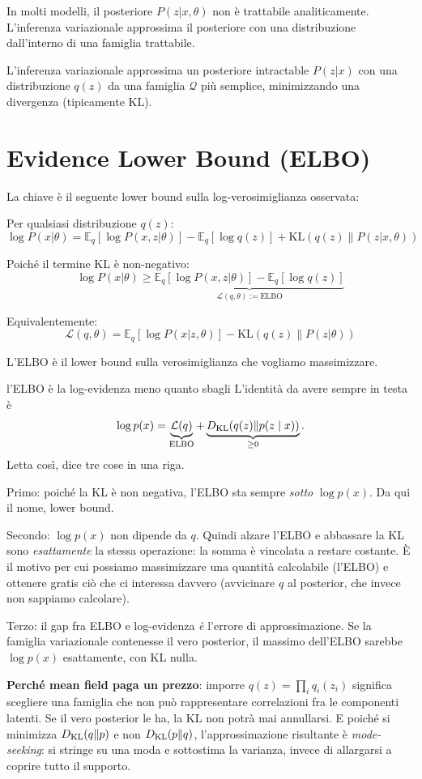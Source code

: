 In molti modelli, il posteriore $P(z|x,\theta)$ non è trattabile analiticamente. L'inferenza variazionale approssima il posteriore con una distribuzione dall'interno di una famiglia trattabile.

\begin{definition}
  L'inferenza variazionale approssima un posteriore intractable $P(z|x)$ con una distribuzione $q(z)$ da una famiglia $\mathcal{Q}$ più semplice, minimizzando una divergenza (tipicamente KL).
\end{definition}

\section{Evidence Lower Bound (ELBO)}

La chiave è il seguente lower bound sulla log-verosimiglianza osservata:

\begin{theorem}
  Per qualsiasi distribuzione $q(z)$:
  \[\log P(x|\theta) = \mathbb{E}_q[\log P(x,z|\theta)] - \mathbb{E}_q[\log q(z)] + \text{KL}(q(z) \| P(z|x,\theta))\]

  Poiché il termine KL è non-negativo:
  \[\log P(x|\theta) \geq \underbrace{\mathbb{E}_q[\log P(x,z|\theta)] - \mathbb{E}_q[\log q(z)]}_{\mathcal{L}(q,\theta) := \text{ELBO}}\]
\end{theorem}

Equivalentemente:
\[\mathcal{L}(q,\theta) = \mathbb{E}_q[\log P(x|z,\theta)] - \text{KL}(q(z) \| P(z|\theta))\]

L'ELBO è il lower bound sulla verosimiglianza che vogliamo massimizzare.

\begin{intuizione}{l'ELBO è la log-evidenza meno quanto sbagli}
L'identità da avere sempre in testa è
\[
\log p(x) = \underbrace{\mathcal{L}(q)}_{\text{ELBO}} + \underbrace{D_{\mathrm{KL}}\!\left(q(z) \| p(z \mid x)\right)}_{\geq 0}.
\]
Letta così, dice tre cose in una riga.

Primo: poiché la KL è non negativa, l'ELBO sta sempre \emph{sotto} $\log p(x)$. Da qui il nome, lower bound.

Secondo: $\log p(x)$ non dipende da $q$. Quindi alzare l'ELBO e abbassare la KL sono \emph{esattamente} la stessa operazione: la somma è vincolata a restare costante. È il motivo per cui possiamo massimizzare una quantità calcolabile (l'ELBO) e ottenere gratis ciò che ci interessa davvero (avvicinare $q$ al posterior, che invece non sappiamo calcolare).

Terzo: il gap fra ELBO e log-evidenza \emph{è} l'errore di approssimazione. Se la famiglia variazionale contenesse il vero posterior, il massimo dell'ELBO sarebbe $\log p(x)$ esattamente, con KL nulla.

\textbf{Perché mean field paga un prezzo}: imporre $q(z) = \prod_i q_i(z_i)$ significa scegliere una famiglia che non può rappresentare correlazioni fra le componenti latenti. Se il vero posterior le ha, la KL non potrà mai annullarsi. E poiché si minimizza $D_{\mathrm{KL}}\!\left(q \| p\right)$ e non $D_{\mathrm{KL}}\!\left(p \| q\right)$, l'approssimazione risultante è \emph{mode-seeking}: si stringe su una moda e sottostima la varianza, invece di allargarsi a coprire tutto il supporto.
\end{intuizione}


